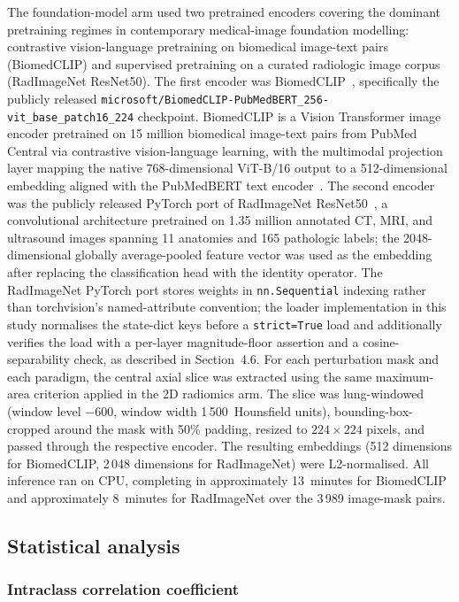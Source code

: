 The foundation-model arm used two pretrained encoders covering the dominant pretraining regimes in contemporary medical-image foundation modelling: contrastive vision-language pretraining on biomedical image-text pairs (BiomedCLIP) and supervised pretraining on a curated radiologic image corpus (RadImageNet ResNet50). The first encoder was BiomedCLIP~\cite{zhang2024biomedclip}, specifically the publicly released \texttt{microsoft/BiomedCLIP-Pub\-MedBERT\_256-vit\_base\_patch16\_224} checkpoint. BiomedCLIP is a Vision Transformer image encoder pretrained on 15 million biomedical image-text pairs from PubMed Central via contrastive vision-language learning, with the multimodal projection layer mapping the native 768-dimensional ViT-B/16 output to a 512-dimensional embedding aligned with the PubMedBERT text encoder~\cite{zhang2024biomedclip}. The second encoder was the publicly released PyTorch port of RadImageNet ResNet50~\cite{mei2022radimagenet}, a convolutional architecture pretrained on 1.35 million annotated CT, MRI, and ultrasound images spanning 11 anatomies and 165 pathologic labels; the 2048-dimensional globally average-pooled feature vector was used as the embedding after replacing the classification head with the identity operator. The RadImageNet PyTorch port stores weights in \texttt{nn.Sequential} indexing rather than torchvision's named-attribute convention; the loader implementation in this study normalises the state-dict keys before a \texttt{strict=True} load and additionally verifies the load with a per-layer magnitude-floor assertion and a cosine-separability check, as described in Section~4.6. For each perturbation mask and each paradigm, the central axial slice was extracted using the same maximum-area criterion applied in the 2D radiomics arm. The slice was lung-windowed (window level $-600$, window width 1\,500~Hounsfield units), bounding-box-cropped around the mask with 50\% padding, resized to $224 \times 224$ pixels, and passed through the respective encoder. The resulting embeddings (512 dimensions for BiomedCLIP, 2\,048 dimensions for RadImageNet) were L2-normalised. All inference ran on CPU, completing in approximately 13~minutes for BiomedCLIP and approximately 8~minutes for RadImageNet over the 3\,989 image-mask pairs.

\subsection{Statistical analysis}

\subsubsection{Intraclass correlation coefficient}

